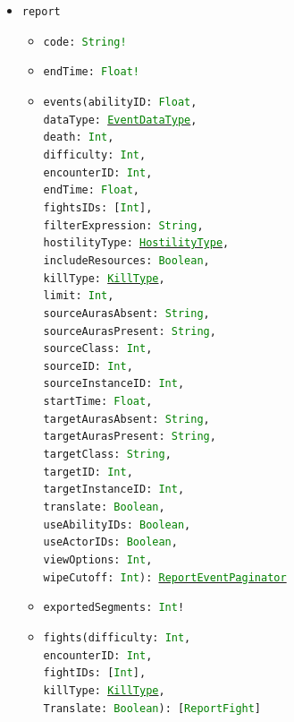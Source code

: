 \documentclass[10pt, a4paper]{memoir}
\numberwithin{equation}{section}
\theoremstyle{plain}
\theoremstyle{defp}
\theoremstyle{dotless}
\theoremstyle{definition}
\theoremstyle{dotless}
\theoremstyle{dotless}
\theoremstyle{defp}
\theoremstyle{defp}
\theoremstyle{be}          %
\theoremstyle{defp}
\newcommand\ttt[1]{\texttt{#1}}
\newcommand\type[1]{\ttt{\textcolor{green}{#1}}}
\begin{document}
\begin{itemize}[noitemsep,topsep=1pt]
	\item \ttt{report}
	\begin{itemize}[itemsep=1pt,topsep=1pt]
		\item \ttt{code: \type{String!}}
		\item \ttt{endTime: \type{Float!}}
		\item \ttt{events(abilityID: \type{Float}, \\dataType: \hyperref[sec:EventDataType]{\type{EventDataType}}, \\death: \type{Int}, \\difficulty: \type{Int}, \\encounterID: \type{Int}, \\endTime: \type{Float}, \\fightsIDs: [\type{Int}], \\ filterExpression: \type{String}, \\hostilityType: \hyperref[sec:HostilityType]{\type{HostilityType}}, \\includeResources: \type{Boolean}, \\killType: \hyperref[sec:KillType]{\type{KillType}}, \\limit: \type{Int}, \\sourceAurasAbsent: \type{String}, \\sourceAurasPresent: \type{String}, \\sourceClass: \type{Int}, \\sourceID: \type{Int},  \\sourceInstanceID: \type{Int}, \\startTime: \type{Float}, \\targetAurasAbsent: \type{String}, \\targetAurasPresent: \type{String}, \\targetClass: \type{String}, \\targetID: \type{Int}, \\targetInstanceID: \type{Int}, \\translate: \type{Boolean}, \\useAbilityIDs: \type{Boolean}, \\useActorIDs: \type{Boolean}, \\viewOptions: \type{Int}, \\wipeCutoff: \type{Int}): \hyperref[sec:reporteventpaginator]{\type{ReportEventPaginator}}}
		\item \ttt{exportedSegments: \type{Int}!}
		\item \ttt{fights(difficulty: \type{Int}, \\encounterID: \type{Int}, \\fightIDs: [\type{Int}], \\killType: \hyperref[sec:KillType]{\type{KillType}}, \\Translate: \type{Boolean}): [\type{ReportFight}]}

\end{itemize}
\end{itemize}
\end{document}

